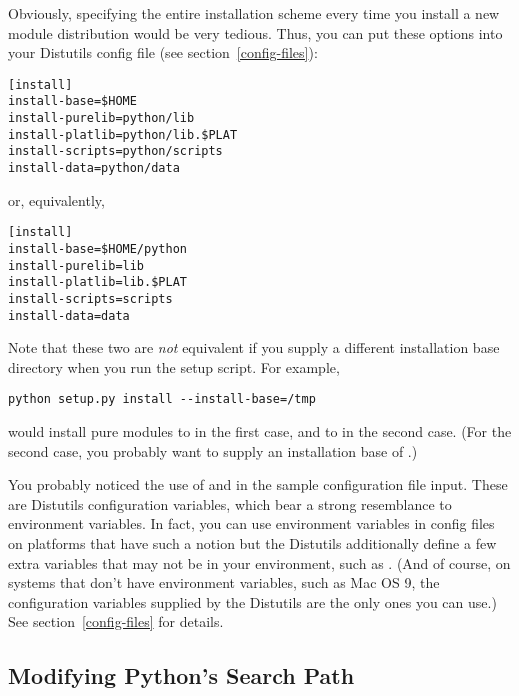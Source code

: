 \documentclass{howto}
\begin{document}
Obviously, specifying the entire installation scheme every time you
install a new module distribution would be very tedious.  Thus, you can
put these options into your Distutils config file (see
section~\ref{config-files}):

\begin{verbatim}
[install]
install-base=$HOME
install-purelib=python/lib
install-platlib=python/lib.$PLAT
install-scripts=python/scripts
install-data=python/data
\end{verbatim}

or, equivalently,

\begin{verbatim}
[install]
install-base=$HOME/python
install-purelib=lib
install-platlib=lib.$PLAT
install-scripts=scripts
install-data=data
\end{verbatim}

Note that these two are \emph{not} equivalent if you supply a different
installation base directory when you run the setup script.  For example,

\begin{verbatim}
python setup.py install --install-base=/tmp
\end{verbatim}

would install pure modules to  in the first
case, and to  in the second case.  (For the second
case, you probably want to supply an installation base of
.)

You probably noticed the use of  and  in the
sample configuration file input.  These are Distutils configuration
variables, which bear a strong resemblance to environment variables.
In fact, you can use environment variables in config files on
platforms that have such a notion but the Distutils additionally
define a few extra variables that may not be in your environment, such
as .  (And of course, on systems that don't have
environment variables, such as Mac OS 9, the configuration
variables supplied by the Distutils are the only ones you can use.)
See section~\ref{config-files} for details.



\subsection{Modifying Python's Search Path}
\label{search-path}
\end{document}

